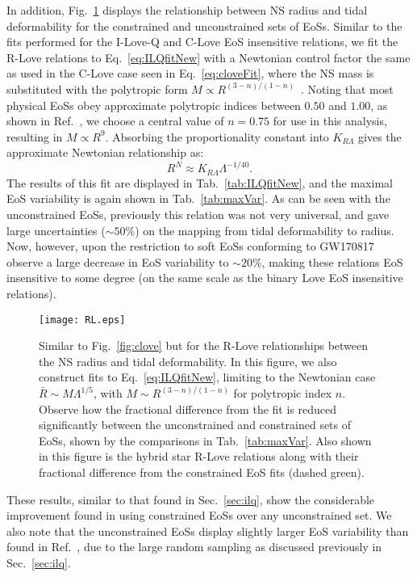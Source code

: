 \documentclass[prd,twocolumn,nofootinbib,superscriptaddress,amsmath,amssymb]{revtex4-1}
\begin{document}
In addition, Fig.~\ref{fig:rlove} displays the relationship between NS radius and tidal deformability for the constrained and unconstrained sets of EoSs.
Similar to the fits performed for the I-Love-Q and C-Love EoS insensitive relations, we fit the R-Love relations to Eq.~\ref{eq:ILQfitNew} with a Newtonian control factor the same as used in the C-Love case seen in Eq.~\ref{eq:cloveFit}, where the NS mass is substituted with the polytropic form $M\propto R^{(3-n)/(1-n)}$~\cite{Shapiro:MRpolytrope}.
Noting that most physical EoSs obey approximate polytropic indices between $0.50$ and $1.00$, as shown in Ref.~\cite{Yagi:binLove}, we choose a central value of $n=0.75$ for use in this analysis, resulting in $M\propto R^9$.
Absorbing the proportionality constant into $K_{R\Lambda}$ gives the approximate Newtonian relationship as:
\begin{equation}
R^N \approx K_{R\Lambda}\Lambda^{-1/40}.
\end{equation}
The results of this fit are displayed in Tab.~\ref{tab:ILQfitNew}, and the maximal EoS variability is again shown in Tab.~\ref{tab:maxVar}.
As can be seen with the unconstrained EoSs, previously this relation was not very universal, and gave large uncertainties ($\sim50\%$) on the mapping from tidal deformability to radius.
Now, however, upon the restriction to soft EoSs conforming to GW170817 observe a large decrease in EoS variability to $\sim20\%$, making these relations EoS insensitive to some degree (on the same scale as the binary Love EoS insensitive relations).
\begin{figure}
\begin{center} 
\texttt{[image: RL.eps]}
\end{center}
\caption{
Similar to Fig.~\ref{fig:clove} but for the R-Love relationships between the NS radius and tidal deformability.
In this figure, we also construct fits to  Eq.~\ref{eq:ILQfitNew}, limiting to the Newtonian case $\bar{R} \sim M\Lambda^{1/5}$, with $M\sim R^{(3-n)/(1-n)}$ for polytropic index $n$.
Observe how the fractional difference from the fit is reduced significantly between the unconstrained and constrained sets of EoSs, shown by the comparisons in Tab.~\ref{tab:maxVar}.
Also shown in this figure is the hybrid star R-Love relations along with their fractional difference from the constrained EoS fits (dashed green).
}
\label{fig:rlove}
\end{figure} 

These results, similar to that found in Sec.~\ref{sec:ilq}, show the considerable improvement found in using constrained EoSs over any unconstrained set.
We also note that the unconstrained EoSs display slightly larger EoS variability than found in Ref.~\cite{Yagi:binLove}, due to the large random sampling as discussed previously in Sec.~\ref{sec:ilq}.
\end{document}
